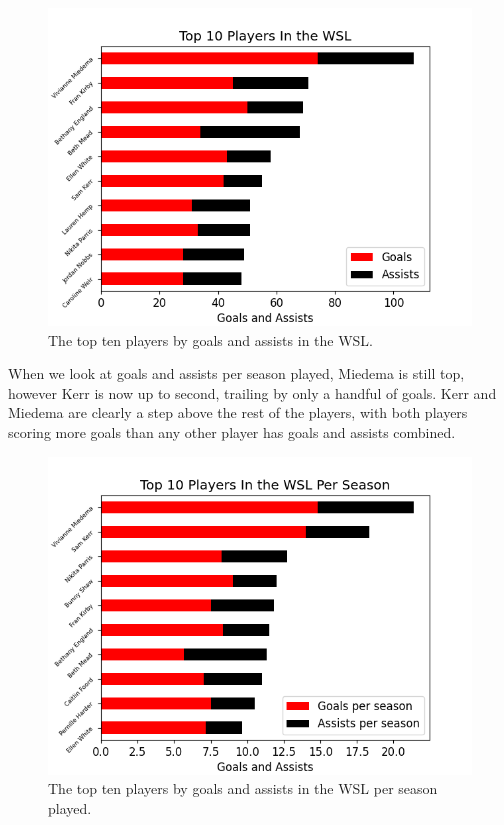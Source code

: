 \documentclass[12pt, a4paper, twocolumn]{article}
\begin{document}
\begin{figure}
  \includegraphics[width=\linewidth]{../vis/playerStats/top_scorers.png}
  \caption{The top ten players by goals and assists in the WSL.}
  \label{top_scorers}
\end{figure}

When we look at goals and assists per season played, Miedema is still top, however Kerr is now up to second, trailing by only a handful of goals. Kerr and Miedema are clearly a step above the rest of the players, with both players scoring more goals than any other player has goals and assists combined.

\begin{figure}
  \includegraphics[width=\linewidth]{../vis/playerStats/top_scorers_perseason.png}
  \caption{The top ten players by goals and assists in the WSL per season played.}
  \label{top_scorers_persseason}
\end{figure}
\end{document}
